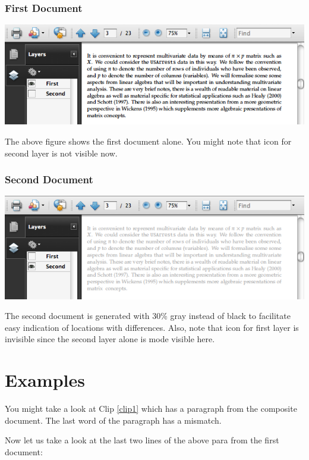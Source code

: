 \documentclass[a4paper]{article}
\begin{document}
\subsubsection*{First Document}
\noindent\includegraphics[width=\linewidth]{ar2.png}

\medskip\noindent The above figure shows the first document alone. You
might note that icon for second layer is not visible now.

\subsubsection*{Second Document}
\noindent\includegraphics[width=\linewidth]{ar3.png}

\medskip\noindent The second document is generated with 30\% gray
instead of black to facilitate easy indication of locations with
differences. Also, note that icon for first layer is invisible since
the second layer alone is mode visible here.

\section{Examples}

You might take a look at Clip \ref{clip1} which has a paragraph from
the composite document. The last word of the paragraph has a
mismatch. 


Now let us take a look at the last two lines of the above para from
the first document:
\end{document}
